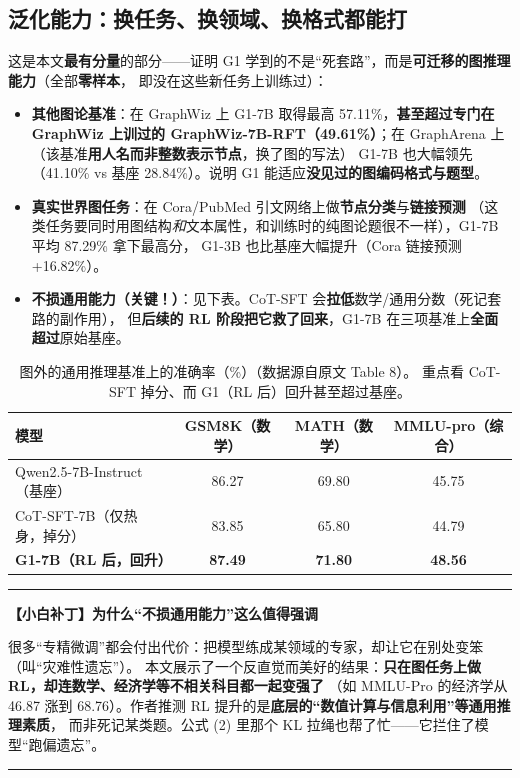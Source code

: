 \documentclass[11pt,UTF8,fontset=fandol]{ctexart}
\newenvironment{tip}[1]{%
  \par\smallskip\noindent\rule{\linewidth}{0.4pt}\par\nobreak
  \noindent\textbf{【小白补丁】#1}\par\nobreak\noindent\ignorespaces
}{%
  \par\noindent\rule{\linewidth}{0.4pt}\par\smallskip
}
\begin{document}
\subsection{泛化能力：换任务、换领域、换格式都能打}

这是本文\textbf{最有分量}的部分——证明 G1 学到的不是“死套路”，而是\textbf{可迁移的图推理能力}（全部\textbf{零样本}，
即没在这些新任务上训练过）：

\begin{itemize}[leftmargin=2em]
  \item \textbf{其他图论基准}：在 GraphWiz 上 G1-7B 取得最高 57.11\%，\textbf{甚至超过专门在 GraphWiz 上训过的
        GraphWiz-7B-RFT（49.61\%）}；在 GraphArena 上（该基准\textbf{用人名而非整数表示节点}，换了图的写法）
        G1-7B 也大幅领先（41.10\% vs 基座 28.84\%）。说明 G1 能适应\textbf{没见过的图编码格式与题型}。
  \item \textbf{真实世界图任务}：在 Cora/PubMed 引文网络上做\textbf{节点分类}与\textbf{链接预测}
        （这类任务要同时用图结构\emph{和}文本属性，和训练时的纯图论题很不一样），G1-7B 平均 87.29\% 拿下最高分，
        G1-3B 也比基座大幅提升（Cora 链接预测 +16.82\%）。
  \item \textbf{不损通用能力（关键！）}：见下表。CoT-SFT 会\textbf{拉低}数学/通用分数（死记套路的副作用），
        但\textbf{后续的 RL 阶段把它救了回来}，G1-7B 在三项基准上\textbf{全面超过}原始基座。
\end{itemize}

\begin{table}[H]\centering
\caption{图外的通用推理基准上的准确率（\%）（数据源自原文 Table 8）。
重点看 CoT-SFT 掉分、而 G1（RL 后）回升甚至超过基座。}
\begin{tabular}{lccc}
\toprule
\textbf{模型} & \textbf{GSM8K（数学）} & \textbf{MATH（数学）} & \textbf{MMLU-pro（综合）} \\
\midrule
Qwen2.5-7B-Instruct（基座）  & 86.27 & 69.80 & 45.75 \\
CoT-SFT-7B（仅热身，掉分）   & 83.85 & 65.80 & 44.79 \\
\textbf{G1-7B（RL 后，回升）} & \textbf{87.49} & \textbf{71.80} & \textbf{48.56} \\
\bottomrule
\end{tabular}
\end{table}

\begin{tip}{为什么“不损通用能力”这么值得强调}
很多“专精微调”都会付出代价：把模型练成某领域的专家，却让它在别处变笨（叫“灾难性遗忘”）。
本文展示了一个反直觉而美好的结果：\textbf{只在图任务上做 RL，却连数学、经济学等不相关科目都一起变强了}
（如 MMLU-Pro 的经济学从 46.87 涨到 68.76）。作者推测 RL 提升的是\textbf{底层的“数值计算与信息利用”等通用推理素质}，
而非死记某类题。公式 (2) 里那个 KL 拉绳也帮了忙——它拦住了模型“跑偏遗忘”。
\end{tip}
\end{document}
